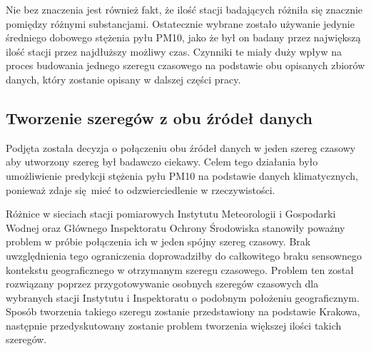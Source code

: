 \documentclass[10pt,a4paper]{article}
\begin{document}
Nie bez znaczenia jest również fakt, że ilość stacji badających różniła się znacznie pomiędzy różnymi substancjami. Ostatecznie wybrane zostało używanie jedynie średniego dobowego stężenia pyłu PM10, jako że był on badany przez największą ilość stacji przez najdłuższy możliwy czas. Czynniki te miały duży wpływ na proces budowania jednego szeregu czasowego na podstawie obu opisanych zbiorów danych, który zostanie opisany w dalszej części pracy.

\subsection{Tworzenie szeregów z obu źródeł danych}
Podjęta została decyzja o połączeniu obu źródeł danych w jeden szereg czasowy aby utworzony szereg był badawczo ciekawy. Celem tego działania było umożliwienie predykcji stężenia pyłu PM10 na podstawie danych klimatycznych, ponieważ zdaje się mieć to odzwierciedlenie w rzeczywistości.

Różnice w sieciach stacji pomiarowych Instytutu Meteorologii i Gospodarki Wodnej oraz Głównego Inspektoratu Ochrony Środowiska stanowiły poważny problem w próbie połączenia ich w jeden spójny szereg czasowy. Brak uwzględnienia tego ograniczenia doprowadziłby do całkowitego braku sensownego kontekstu geograficznego w otrzymanym szeregu czasowego. Problem ten został rozwiązany poprzez przygotowywanie osobnych szeregów czasowych dla wybranych stacji Instytutu i Inspektoratu o podobnym położeniu geograficznym. Sposób tworzenia takiego szeregu zostanie przedstawiony na podstawie Krakowa, następnie przedyskutowany zostanie problem tworzenia większej ilości takich szeregów. 
\end{document}
